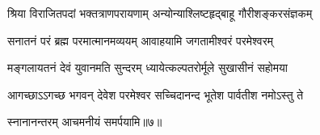 \twolineshloka
{श्रिया विराजितपदां भक्तत्राणपरायणाम्}
{अन्योन्याश्लिष्टहृद्बाहू गौरीशङ्करसंज्ञकम्}

\twolineshloka
{सनातनं परं ब्रह्म परमात्मानमव्ययम्}
{आवाहयामि जगतामीश्वरं परमेश्वरम्}

\twolineshloka
{मङ्गलायतनं देवं युवानमति सुन्दरम्}
{ध्यायेत्कल्पतरोर्मूले सुखासीनं सहोमया}

\twolineshloka
{आगच्छाऽऽगच्छ भगवन् देवेश परमेश्वर}
{सच्चिदानन्द भूतेश पार्वतीश नमोऽस्तु ते}

{\small\closesection}








स्नानानन्तरम् आचमनीयं समर्पयामि॥७॥




